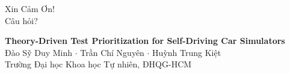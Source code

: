 \documentclass[aspectratio=169,10pt]{beamer}
\begin{document}
%
%
%
%
\begin{frame}[standout]
\centering
\vspace{0.8em}
\Huge Xin Cảm Ơn!\\[0.5em]
\Large \textcolor{accent}{Câu hỏi?}

\vspace{1.5em}
\normalsize
\textbf{Theory-Driven Test Prioritization for Self-Driving Car Simulators}\\[0.3em]
\scriptsize
Đào Sỹ Duy Minh \quad $\cdot$ \quad Trần Chí Nguyên \quad $\cdot$ \quad Huỳnh Trung Kiệt\\
Trường Đại học Khoa học Tự nhiên, ĐHQG-HCM
\end{frame}
\end{document}
